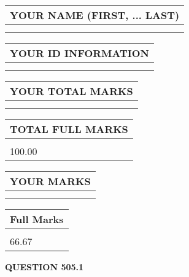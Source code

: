 \documentclass{ctexart}
\begin{document}
   
   
   
\newpage 
\setcounter{page}{ 
   505001 } 
   
   
   
   
\noindent\begin{tabular}{|l|}
\hline
YOUR NAME (FIRST, ... LAST)  \\
\hline
 \\ 
 \\ 
\hline
\end{tabular}
\hspace{0.05in} \begin{tabular}{|l|}
\hline
 YOUR   ID   INFORMATION  \\
\hline
 \\ 
 \\ 
\hline
\end{tabular}
   
   
\vspace{0.2in}\noindent\begin{tabular}{|l|}
\hline
YOUR TOTAL MARKS  \\
\hline
 \\ 
 \\ 
\hline
\end{tabular}
\hspace{0.05in} \begin{tabular}{|l|}
\hline
TOTAL FULL MARKS  \\
\hline
 \\ 
100.00 \\
\hline
\end{tabular}
   
   
 \vspace{0.2in}
 
 
 
 
   
   
  
\vspace{0.2in}
  
\noindent\begin{tabular}{|l|}
\hline
 YOUR MARKS  \\
\hline
 \\ 
 \\ 
\hline
\end{tabular}
\hspace{0.05in} \begin{tabular}{|l|}
\hline
 Full Marks  \\
\hline
 \\ 
66.67 \\
\hline
\end{tabular}
{\textbf{\Large{QUESTION
505.1 
}}}
  
\end{document}

